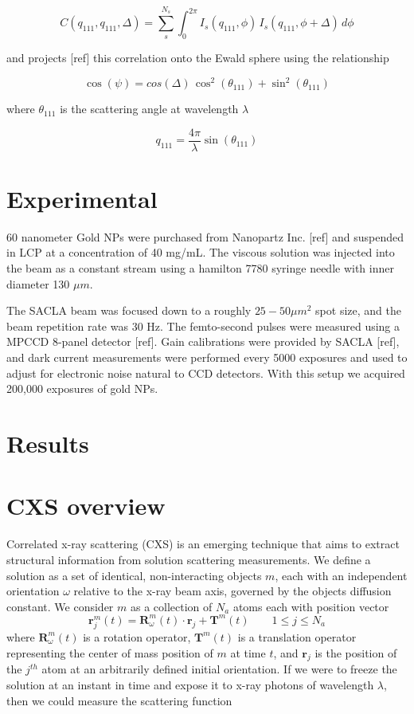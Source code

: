 \documentclass [11pt,fleqn]{article}
\def \be {\begin{equation}}
\def \ee {\end{equation}}
\begin{document}
\be
C(q_{111}, q_{111}, \Delta) = \sum _s ^ {N_s} \int _0^{2\pi} I_s(q_{111}, \phi  )\, I_s(q_{111}, \phi + \Delta)\, d\phi
\ee

and projects [ref] this correlation onto the Ewald sphere using the relationship

\be
\cos( \psi) = cos( \Delta ) \, \cos ^2 ( \theta_{111} )  + \sin ^2(\theta_{111} )  
\ee

where $\theta_{111}$ is the scattering angle at wavelength $\lambda$

\be
q_{111} = \frac{ 4\pi }{\lambda } \sin (\theta_{111})  
\ee


\section{Experimental}
60 nanometer Gold NPs were purchased from Nanopartz Inc. [ref] and suspended in LCP at a concentration of 40 mg/mL. The viscous solution was injected into the beam as a constant stream using a  hamilton 7780 syringe needle with inner diameter 130 $\mu m$.

The SACLA beam was focused down to a roughly $25 − 50 \mu m ^2$ spot size, and the beam repetition rate was 30 Hz. The femto-second pulses were measured using a MPCCD 8-panel detector [ref]. Gain calibrations were provided by SACLA [ref], and dark current measurements were performed every 5000 exposures and used to adjust for electronic noise natural to CCD detectors. With this setup we acquired 200,000 exposures of gold NPs. 

\section{Results}

\section{CXS overview}
Correlated x-ray scattering (CXS) is an emerging technique that aims to extract structural information from solution scattering measurements. We define a solution as a set of identical, non-interacting objects $m$, each with an independent orientation $\omega$ relative to the x-ray beam axis, governed by the objects diffusion constant. We consider $m$ as a collection of $N_a$ atoms each with position vector 
\be
\bm r^m_j (t) = \bm R^m_\omega (t)\cdot \bm r_j + \bm T^m(t) \qquad 1 \le j \le N_a
\ee 
where $\bm R^m_\omega(t)$ is a rotation operator, $\bm T^m (t)$ is a translation operator representing the center of mass position of $m$ at time $t$, and $\bm r_j$ is the position of the $j^{th}$ atom at an arbitrarily defined initial orientation. If we were to freeze the solution at an instant in time and expose it to x-ray photons of wavelength $\lambda$, then we could measure the scattering function
\end{document}
